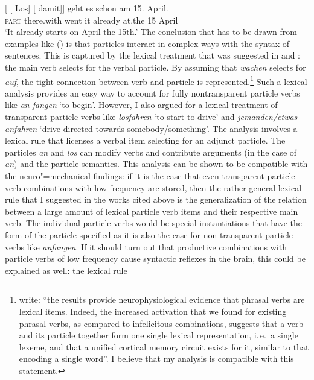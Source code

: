 \begin{exe}
\begin{xlist}[iv.]
\begin{exe}
\begin{xlist}[iv.]
\ex
\gll {}[ [ Los]        [ damit]]    geht es schon   am 15. April.\footnotemark\\
       {}        {}        \textsc{part}  {}        there.with went it already at.the 15 April\\%
%
\glt `It already starts on April the 15th.'
\zl
The conclusion that has to be drawn from examples like () is that particles interact in
complex ways with the syntax of sentences. This is captured by the lexical treatment that was
suggested in  and : the main verb selects for the verbal
particle. By assuming that \emph{wachen} selects for \emph{auf}, the tight connection between verb
and particle is represented.\footnote{
\citet[]{CSP2010a} write: ``the results provide neurophysiological evidence that
  phrasal verbs are lexical items. Indeed, the increased activation that we found for existing
  phrasal verbs, as compared to infelicitous combinations, suggests that a verb and its particle
  together form one single lexical representation, i.\,e.\ a single lexeme, and that a unified
  cortical memory circuit exists for it, similar to that encoding a single word''.
I believe that my analysis is compatible with this statement.
} Such a lexical analysis provides an easy way to account for fully
nontransparent particle verbs like \emph{an-fangen} `to begin'. However, I also argued for a
lexical treatment of transparent particle verbs like \emph{losfahren} `to start to drive' and
\emph{jemanden/etwas anfahren} `drive directed towards somebody/something'. The
analysis involves a lexical rule that licenses a verbal item selecting for an adjunct
particle. The particles \emph{an} and \emph{los} can modify verbs and contribute arguments (in the
case of \emph{an}) and the particle semantics. This analysis can be shown to be compatible with the
neuro"=mechanical findings: if it is the case that even transparent particle verb combinations with
low frequency are stored, then the rather general lexical rule that I suggested in the works cited above is the
generalization of the relation between a large amount of lexical particle verb items and their respective main
verb. The individual particle verbs would be special instantiations that have the form of the
particle specified as it is also the case for non-transparent particle verbs like \emph{anfangen}.
If it should turn out that productive combinations with particle verbs of low
frequency cause syntactic reflexes in the brain, this could be explained as well: the lexical rule

\end{xlist}
\end{exe}
\end{xlist}
\end{exe}
